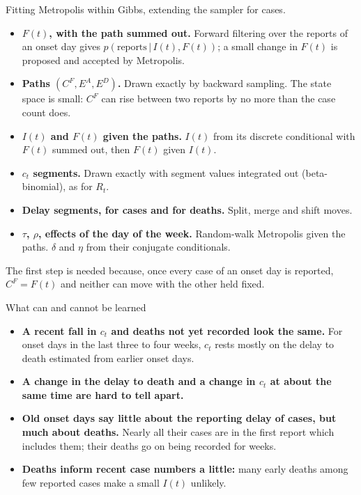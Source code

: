 \documentclass[aspectratio=169,9pt]{beamer}
\newcommand{\given}{\,|\,}
\begin{document}
\begin{frame}{Fitting}
Metropolis within Gibbs, extending the sampler for cases.

\bigskip
\begin{itemize}
\item \textbf{$F(t)$, with the path summed out.} Forward filtering over the
reports of an onset day gives $p(\text{reports}\given I(t),F(t))$; a small
change in $F(t)$ is proposed and accepted by Metropolis.
\item \textbf{Paths $(C^{F},E^{A},E^{D})$.} Drawn exactly by backward
sampling. The state space is small: $C^{F}$ can rise between two reports by
no more than the case count does.
\item \textbf{$I(t)$ and $F(t)$ given the paths.} $I(t)$ from its discrete
conditional with $F(t)$ summed out, then $F(t)$ given $I(t)$.
\item \textbf{$c_t$ segments.} Drawn exactly with segment values integrated
out (beta-binomial), as for $R_t$.
\item \textbf{Delay segments, for cases and for deaths.} Split, merge and
shift moves.
\item \textbf{$\tau$, $\rho$, effects of the day of the week.} Random-walk
Metropolis given the paths. $\delta$ and $\eta$ from their conjugate
conditionals.
\end{itemize}

\bigskip
{\small The first step is needed because, once every case of an onset day is
reported, $C^{F}=F(t)$ and neither can move with the other held fixed.}
\end{frame}

\begin{frame}{What can and cannot be learned}
\begin{itemize}
\item \textbf{A recent fall in $c_t$ and deaths not yet recorded look the
same.} For onset days in the last three to four weeks, $c_t$ rests mostly
on the delay to death estimated from earlier onset days.
\item \textbf{A change in the delay to death and a change in $c_t$ at about
the same time are hard to tell apart.}
\item \textbf{Old onset days say little about the reporting delay of cases,
but much about deaths.} Nearly all their cases are in the first report
which includes them; their deaths go on being recorded for weeks.
\item \textbf{Deaths inform recent case numbers a little:} many early deaths
among few reported cases make a small $I(t)$ unlikely.
\end{itemize}
\end{frame}
\end{document}
